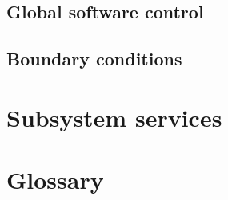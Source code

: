 \documentclass[11pt]{article}
\begin{document}
		\subsection{Global software control}
		
			
		
		\subsection{Boundary conditions}
		
			
		
	\section{Subsystem services}
	
		
	
	\section{Glossary}
	
		
		
\end{document}
